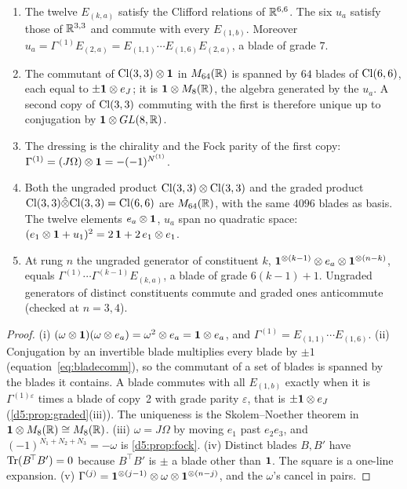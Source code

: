 \begin{proposition}
\label{e1:prop:copies}
\begin{enumerate}[label=(\roman*),leftmargin=2.2em]
\item The twelve $E_{(k,a)}$ satisfy the Clifford relations of $\mathbb{R}^{6,6}$. The six $u_a$ satisfy those of $\mathbb{R}^{3,3}$ and commute with every
$E_{(1,b)}$. Moreover $u_a=\Gamma^{(1)}E_{(2,a)}=E_{(1,1)}\cdots E_{(1,6)}E_{(2,a)}$, a blade of grade $7$.
\item The commutant of $\mathrm{Cl}(3,3)\otimes\mathbf 1$ in $M_{64}(\mathbb{R})$ is spanned by $64$ blades of $\mathrm{Cl}(6,6)$, each equal to $\pm\mathbf 1\otimes e_J$; it is
$\mathbf 1\otimes M_8(\mathbb{R})$, the algebra generated by the $u_a$. A second copy of $\mathrm{Cl}(3,3)$ commuting with the first is therefore unique up to
conjugation by $\mathbf 1\otimes GL(8,\mathbb{R})$.
\item The dressing is the chirality and the Fock parity of the first copy: $\Gamma^{(1)}=(J\Omega)\otimes\mathbf 1=-(-1)^{N^{(1)}}$.
\item Both the ungraded product $\mathrm{Cl}(3,3)\otimes\mathrm{Cl}(3,3)$ and the graded product $\mathrm{Cl}(3,3)\hat\otimes\mathrm{Cl}(3,3)=\mathrm{Cl}(6,6)$ are $M_{64}(\mathbb{R})$, with
the same $4096$ blades as basis. The twelve elements $e_a\otimes\mathbf 1$, $u_a$ span no quadratic space: $(e_1\otimes\mathbf 1+u_1)^2=2\,\mathbf 1+2\,e_1\otimes e_1$.
\item At rung $n$ the ungraded generator of constituent $k$, $\mathbf 1^{\otimes(k-1)}\otimes e_a\otimes\mathbf 1^{\otimes(n-k)}$, equals
$\Gamma^{(1)}\cdots\Gamma^{(k-1)}E_{(k,a)}$, a blade of grade $6(k-1)+1$. Ungraded generators of distinct constituents commute and graded
ones anticommute (checked at $n=3,4$).
\end{enumerate}
\end{proposition}

\begin{proof}
(i) $(\omega\otimes\mathbf 1)(\omega\otimes e_a)=\omega^2\otimes e_a=\mathbf 1\otimes e_a$, and $\Gamma^{(1)}=E_{(1,1)}\cdots E_{(1,6)}$. (ii) Conjugation by an
invertible blade multiplies every blade by $\pm1$ (equation~\cref{eq:bladecomm}), so the commutant of a set of blades is spanned by the
blades it contains. A blade commutes with all $E_{(1,b)}$ exactly when it is $\Gamma^{(1)\varepsilon}$ times a blade of copy~2 with grade
parity $\varepsilon$, that is $\pm\mathbf 1\otimes e_J$ (\cref{d5:prop:graded}(iii)). The uniqueness is the Skolem--Noether theorem in
$\mathbf 1\otimes M_8(\mathbb{R})\cong M_8(\mathbb{R})$. (iii) $\omega=J\Omega$ by moving $e_1$ past $e_2e_3$, and $(-1)^{N_1+N_2+N_3}=-\omega$ is \cref{d5:prop:fock}. (iv) Distinct blades $B,B'$ have $\operatorname{Tr}(B^{\!\top}B')=0$ because $B^{\!\top}B'$ is $\pm$ a blade other than $\mathbf 1$. The square is
a one-line expansion. (v) $\Gamma^{(j)}=\mathbf 1^{\otimes(j-1)}\otimes\omega\otimes\mathbf 1^{\otimes(n-j)}$, and the $\omega$'s cancel in pairs.
\end{proof}

